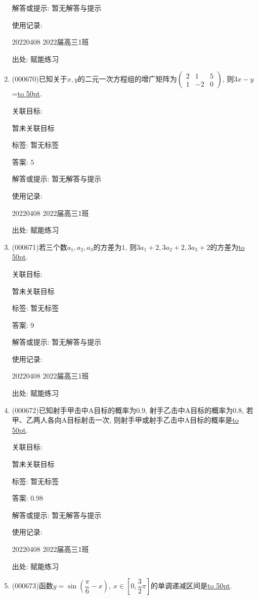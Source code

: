\documentclass[10pt,a4paper]{article}
\newcommand{\blank}[1]{\underline{\hbox to #1pt{}}}
\begin{document}
\begin{enumerate}[1.]
解答或提示: 暂无解答与提示

使用记录:

20220408	2022届高三1班	


出处: 赋能练习
\item { (000670)}已知关于$x,y$的二元一次方程组的增广矩阵为$\begin{pmatrix} 2 & 1 & 5  \\ 1 & -2 & 0 \end{pmatrix}$, 则$3x-y$=\blank{50}.


关联目标:

暂未关联目标



标签: 暂无标签

答案: $5$

解答或提示: 暂无解答与提示

使用记录:

20220408	2022届高三1班	


出处: 赋能练习
\item { (000671)}若三个数$a_1,a_2,a_3$的方差为$1$, 则$3a_1+2,3a_2+2,3a_3+2$的方差为\blank{50}.


关联目标:

暂未关联目标



标签: 暂无标签

答案: $9$

解答或提示: 暂无解答与提示

使用记录:

20220408	2022届高三1班	


出处: 赋能练习
\item { (000672)}已知射手甲击中A目标的概率为$0.9$, 射手乙击中A目标的概率为$0.8$, 若甲、乙两人各向A目标射击一次, 则射手甲或射手乙击中A目标的概率是\blank{50}.


关联目标:

暂未关联目标



标签: 暂无标签

答案: $0.98$

解答或提示: 暂无解答与提示

使用记录:

20220408	2022届高三1班	


出处: 赋能练习
\item { (000673)}函数$y=\sin (\dfrac{\pi}6-x), \ x\in [0,\dfrac32\pi]$的单调递减区间是\blank{50}.



\end{enumerate}
\end{document}
